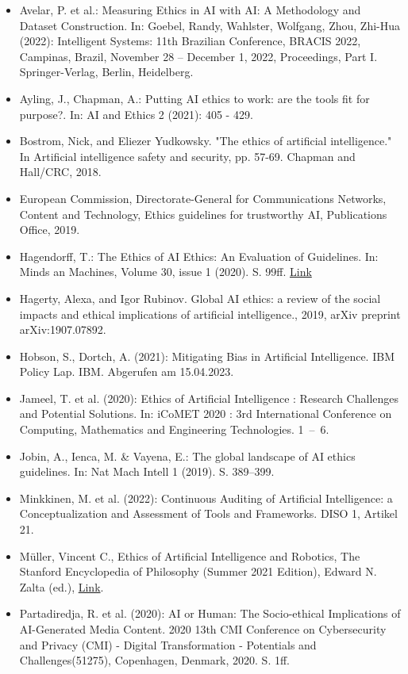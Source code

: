 \documentclass[12pt]{article}
\begin{document}
\begin{itemize}
\item Avelar, P. et al.: Measuring Ethics in AI with AI: A Methodology and Dataset Construction. In: Goebel, Randy, Wahlster, Wolfgang, Zhou, Zhi-Hua (2022): Intelligent Systems: 11th Brazilian Conference, BRACIS 2022, Campinas, Brazil, November 28 – December 1, 2022, Proceedings, Part I. Springer-Verlag, Berlin, Heidelberg.
\item Ayling, J., Chapman, A.: Putting AI ethics to work: are the tools fit for purpose?. In: AI and Ethics 2 (2021): 405 - 429.
\item Bostrom, Nick, and Eliezer Yudkowsky. "The ethics of artificial intelligence." In Artificial intelligence safety and security, pp. 57-69. Chapman and Hall/CRC, 2018.
\item European Commission, Directorate-General for Communications Networks, Content and Technology, Ethics guidelines for trustworthy AI, Publications Office, 2019.
\item Hagendorff, T.: The Ethics of AI Ethics: An Evaluation of Guidelines. In: Minds an Machines, Volume 30, issue 1 (2020). S. 99ff. \href{https://link.springer.com/content/pdf/10.1007/s11023-020-09517-8.pdf}{Link}
\item Hagerty, Alexa, and Igor Rubinov. Global AI ethics: a review of the social impacts and ethical implications of artificial intelligence.,  2019, arXiv preprint arXiv:1907.07892.
\item Hobson, S., Dortch, A. (2021): Mitigating Bias in Artificial Intelligence. IBM Policy Lap. IBM. Abgerufen am 15.04.2023.
\item Jameel, T. et al. (2020): Ethics of Artificial Intelligence : Research Challenges and Potential Solutions. In: iCoMET 2020 : 3rd International Conference on Computing, Mathematics and Engineering Technologies. 1 – 6.
\item Jobin, A., Ienca, M. \& Vayena, E.: The global landscape of AI ethics guidelines. In: Nat Mach Intell 1 (2019). S. 389–399.
\item Minkkinen, M. et al. (2022): Continuous Auditing of Artificial Intelligence: a Conceptualization and Assessment of Tools and Frameworks. DISO 1, Artikel 21.
\item Müller, Vincent C., Ethics of Artificial Intelligence and Robotics, The Stanford Encyclopedia of Philosophy (Summer 2021 Edition), Edward N. Zalta (ed.), \href{https://plato.stanford.edu/archives/sum2021/entries/ethics-ai/}{Link}.
\item Partadiredja, R. et al. (2020): AI or Human: The Socio-ethical Implications of AI-Generated Media Content. 2020 13th CMI Conference on Cybersecurity and Privacy (CMI) - Digital Transformation - Potentials and Challenges(51275), Copenhagen, Denmark, 2020. S. 1ff.

\end{itemize}
\end{document}
